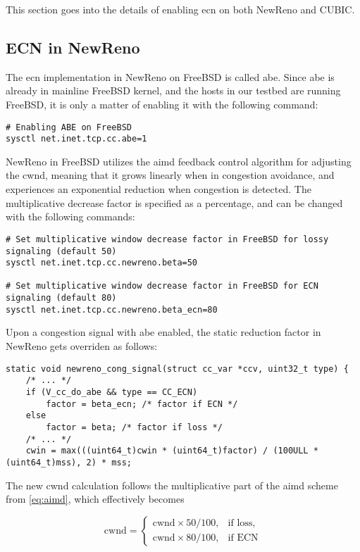 This section goes into the details of enabling \gls{ecn} on both NewReno and CUBIC. 


\subsection{ECN in NewReno}

The \gls{ecn} implementation in NewReno on FreeBSD is called \gls{abe}. Since \gls{abe} is already in mainline FreeBSD kernel, \cite{rfc8511} and the hosts in our testbed are running FreeBSD, it is only a matter of enabling it with the following command:

\begin{verbatim}
# Enabling ABE on FreeBSD
sysctl net.inet.tcp.cc.abe=1
\end{verbatim}
NewReno in FreeBSD utilizes the \gls{aimd} feedback control algorithm for adjusting the \gls{cwnd}, meaning that it grows linearly when in congestion avoidance, and experiences an exponential reduction when congestion is detected. The multiplicative decrease factor is specified as a percentage, and can be changed with the following commands:

\begin{verbatim}
# Set multiplicative window decrease factor in FreeBSD for lossy signaling (default 50)
sysctl net.inet.tcp.cc.newreno.beta=50

# Set multiplicative window decrease factor in FreeBSD for ECN signaling (default 80)
sysctl net.inet.tcp.cc.newreno.beta_ecn=80
\end{verbatim}
Upon a congestion signal with \gls{abe} enabled, the static reduction factor in NewReno gets overriden as follows:

\begin{verbatim}
static void newreno_cong_signal(struct cc_var *ccv, uint32_t type) {
    /* ... */
    if (V_cc_do_abe && type == CC_ECN)
        factor = beta_ecn; /* factor if ECN */
    else
        factor = beta; /* factor if loss */
    /* ... */
    cwin = max(((uint64_t)cwin * (uint64_t)factor) / (100ULL * (uint64_t)mss), 2) * mss;
\end{verbatim}
The new \gls{cwnd} calculation follows the multiplicative part of the \gls{aimd} scheme from \ref{eq:aimd}, which effectively becomes

\begin{equation} \label{eq:cwnd_newreno}
    \mathrm{cwnd} = \begin{cases}
        \mathrm{cwnd} \times 50/100, & \text{if loss},\\
        \mathrm{cwnd} \times 80/100, & \text{if ECN}
    \end{cases}
\end{equation}


